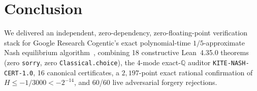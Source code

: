 \documentclass[10pt,twocolumn]{article}
\newcommand{\QQ}{\mathbb{Q}}
\begin{document}
\section{Conclusion}\label{sec:conc}
We delivered an independent, zero-dependency, zero-floating-point verification stack for Google Research Cogentic's exact polynomial-time $1/5$-approximate Nash equilibrium algorithm~\cite{cogentic2026maximin}, combining 18 constructive Lean~4.35.0 theorems (zero \texttt{sorry}, zero \texttt{Classical.choice}), the 4-mode exact-$\QQ$ auditor \texttt{KITE-NASH-CERT-1.0}, 16 canonical certificates, a $2{,}197$-point exact rational confirmation of $H \le -1/3000 < -2^{-14}$, and 60/60 live adversarial forgery rejections.



\end{document}
